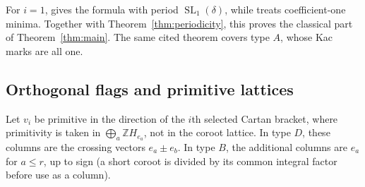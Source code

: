 \documentclass[11pt]{amsart}
\numberwithin{equation}{section}
\theoremstyle{definition}
\DeclareMathOperator{\SL}{SL}
\newcommand{\Z}{\mathbb Z}
\begin{document}
For $i=1$, \cite[Proposition~6.25]{ET} gives the formula with period $\SL_1(\delta)$, while \cite[Theorem~6.14]{ET} treats coefficient-one minima. Together with Theorem~\ref{thm:periodicity}, this proves the classical part of Theorem~\ref{thm:main}. The same cited theorem covers type $A$, whose Kac marks are all one.

\subsection{Orthogonal flags and primitive lattices}\label{subsec:orthogonal-flags}
Let $v_i$ be primitive in the direction of the $i$th selected Cartan bracket, where primitivity is taken in $\bigoplus_a\Z H_{e_a}$, not in the coroot lattice. In type $D$, these columns are the crossing vectors $e_a\pm e_b$. In type $B$, the additional columns are $e_a$ for $a\leq r$, up to sign (a short coroot is divided by its common integral factor before use as a column).
\end{document}
